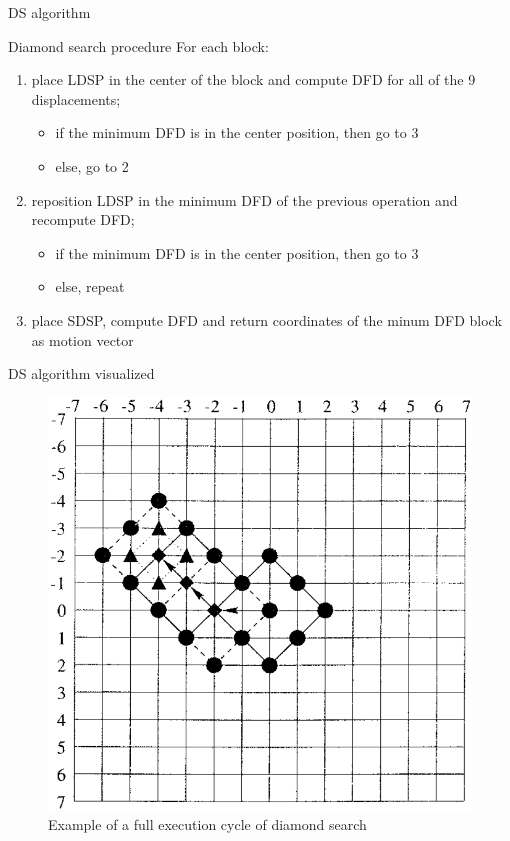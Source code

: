 \documentclass[aspectratio=1610,xcolor=dvipsnames]{beamer}
\begin{document}
\begin{frame}{DS algorithm}
    \begin{block}{Diamond search procedure}
        For each block:
        \begin{enumerate}
            \item place LDSP in the center of the block and compute DFD for all of the 9 displacements;
            \begin{itemize}
                \item if the minimum DFD is in the center position, then go to 3
                \item else, go to 2
            \end{itemize}
            \item reposition LDSP in the minimum DFD of the previous operation and recompute DFD;
            \begin{itemize}
                \item if the minimum DFD is in the center position, then go to 3
                \item else, repeat 
            \end{itemize}
            \item place SDSP, compute DFD and return coordinates of the minum DFD block as motion vector
        \end{enumerate}
    \end{block}
\end{frame}

\begin{frame}{DS algorithm visualized}
    \begin{figure}
        \centering
        \includegraphics[keepaspectratio,width=.45\linewidth]{images/ds-exe.png}
        \caption{Example of a full execution cycle of diamond search}
    \end{figure}    
\end{frame}
\end{document}
